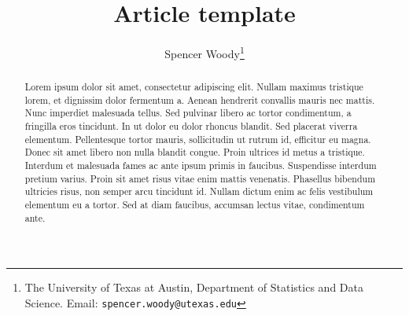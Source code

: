 \documentclass[letter, 10pt]{article} %
\title{Article template}
\author{Spencer Woody\footnote{The University of Texas at Austin,
    Department of Statistics and Data Science. Email:
    \texttt{spencer.woody@utexas.edu}}}
\begin{document}
\maketitle


\begin{abstract}
  Lorem ipsum dolor sit amet, consectetur adipiscing elit. Nullam
  maximus tristique lorem, et dignissim dolor fermentum a. Aenean
  hendrerit convallis mauris nec mattis. Nunc imperdiet malesuada
  tellus. Sed pulvinar libero ac tortor condimentum, a fringilla eros
  tincidunt. In ut dolor eu dolor rhoncus blandit. Sed placerat
  viverra elementum. Pellentesque tortor mauris, sollicitudin ut
  rutrum id, efficitur eu magna. Donec sit amet libero non nulla
  blandit congue. Proin ultrices id metus a tristique. Interdum et
  malesuada fames ac ante ipsum primis in faucibus. Suspendisse
  interdum pretium varius. Proin sit amet risus vitae enim mattis
  venenatis. Phasellus bibendum ultricies risus, non semper arcu
  tincidunt id. Nullam dictum enim ac felis vestibulum elementum eu a
  tortor. Sed at diam faucibus, accumsan lectus vitae, condimentum
  ante.
\end{abstract}










%   



\end{document}
